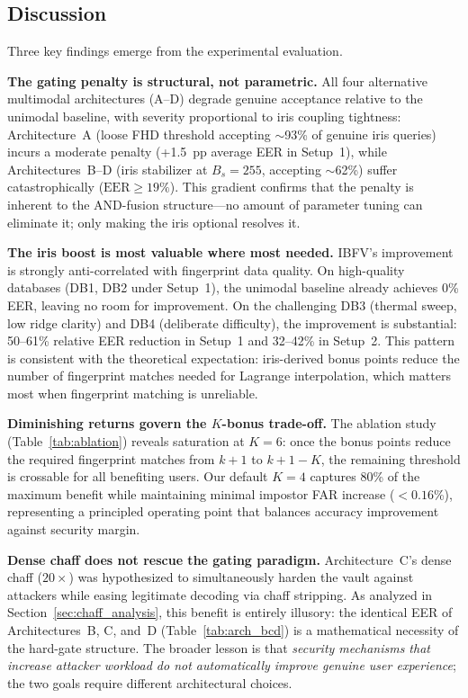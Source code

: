 \documentclass[conference]{IEEEtran}
\newcommand{\IBFV}{\textsf{IBFV}}
\begin{document}
\subsection{Discussion}
\label{sec:discussion}

Three key findings emerge from the experimental evaluation.

\textbf{The gating penalty is structural, not parametric.} All four alternative multimodal architectures (A--D) degrade genuine acceptance relative to the unimodal baseline, with severity proportional to iris coupling tightness: Architecture~A (loose FHD threshold accepting $\sim$93\% of genuine iris queries) incurs a moderate penalty (+1.5~pp average EER in Setup~1), while Architectures~B--D (iris stabilizer at $B_s = 255$, accepting $\sim$62\%) suffer catastrophically ($\text{EER} \geq 19\%$). This gradient confirms that the penalty is inherent to the AND-fusion structure---no amount of parameter tuning can eliminate it; only making the iris optional resolves it.

\textbf{The iris boost is most valuable where most needed.} \IBFV{}'s improvement is strongly anti-correlated with fingerprint data quality. On high-quality databases (DB1, DB2 under Setup~1), the unimodal baseline already achieves 0\% EER, leaving no room for improvement. On the challenging DB3 (thermal sweep, low ridge clarity) and DB4 (deliberate difficulty), the improvement is substantial: 50--61\% relative EER reduction in Setup~1 and 32--42\% in Setup~2. This pattern is consistent with the theoretical expectation: iris-derived bonus points reduce the number of fingerprint matches needed for Lagrange interpolation, which matters most when fingerprint matching is unreliable.

\textbf{Diminishing returns govern the $K$-bonus trade-off.} The ablation study (Table~\ref{tab:ablation}) reveals saturation at $K = 6$: once the bonus points reduce the required fingerprint matches from $k+1$ to $k+1-K$, the remaining threshold is crossable for all benefiting users. Our default $K = 4$ captures 80\% of the maximum benefit while maintaining minimal impostor FAR increase ($< 0.16$\%), representing a principled operating point that balances accuracy improvement against security margin.

\textbf{Dense chaff does not rescue the gating paradigm.} Architecture~C's dense chaff ($20\times$) was hypothesized to simultaneously harden the vault against attackers while easing legitimate decoding via chaff stripping. As analyzed in Section~\ref{sec:chaff_analysis}, this benefit is entirely illusory: the identical EER of Architectures~B, C, and~D (Table~\ref{tab:arch_bcd}) is a mathematical necessity of the hard-gate structure. The broader lesson is that \emph{security mechanisms that increase attacker workload do not automatically improve genuine user experience}; the two goals require different architectural choices.
\end{document}
